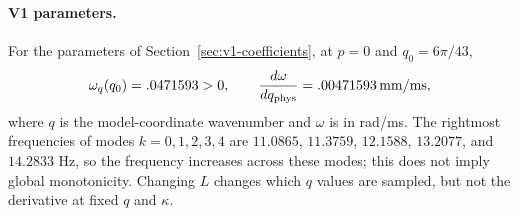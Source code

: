 \documentclass[11pt]{article}
\newcommand{\ee}{\mathrm{e}}
\begin{document}


\paragraph{V1 parameters.}
For the parameters of Section~\ref{sec:v1-coefficients}, at $p=0$ and
$q_0=6\pi/43$,
\begin{equation}
 \omega_q(q_0)=.0471593>0,\qquad
 \frac{d\omega}{dq_{\rm phys}}=.00471593\,\mathrm{mm/ms},
 \label{eq:v1-local-frequency-slope}
\end{equation}
where $q$ is the model-coordinate wavenumber and $\omega$ is in rad/ms.
The rightmost frequencies of modes $k=0,1,2,3,4$ are
$11.0865$, $11.3759$, $12.1588$, $13.2077$, and $14.2833$ Hz, so the
frequency increases across these modes; this does not imply global
monotonicity. Changing $L$ changes which $q$ values are sampled, but not the
derivative at fixed $q$ and $\kappa$.

\end{document}
